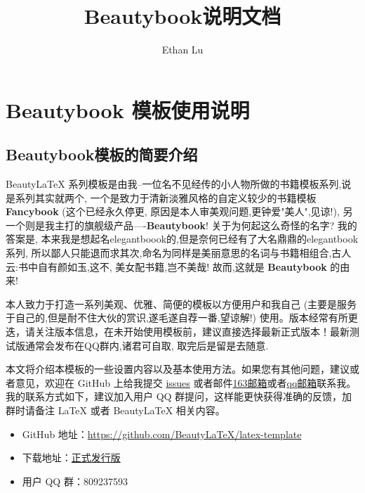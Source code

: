 \documentclass{Beautybook-V6.1}
\begin{document}
\thispagestyle{empty}
\title{Beautybook说明文档}
\subtitle{}
\author{Ethan Lu}
\makecover




\frontmatter
{}

\thispagestyle{empty}
\tableofcontents\let\cleardoublepage\clearpage

\mainmatter
{}
\part{\textbf{Beautybook} 模板使用说明}

\chapter{Beautybook模板的简要介绍}
Beauty\LaTeX{} 系列模板是由我--一位名不见经传的小人物所做的书籍模板系列,说是系列其实就两个, 一个是致力于清新淡雅风格的自定义较少的书籍模板 \textbf{Fancybook} (这个已经永久停更, 原因是本人审美观问题,更钟爱"美人",见谅!), 另一个则是我主打的旗舰级产品----\textbf{Beautybook}! 关于为何起这么奇怪的名字? 我的答案是, 本来我是想起名elegantboook的,但是奈何已经有了大名鼎鼎的elegantbook系列, 所以鄙人只能退而求其次,命名为同样是美丽意思的名词与书籍相组合,古人云:书中自有颜如玉,这不, 美女配书籍,岂不美哉! 故而,这就是 \textbf{Beautybook} 的由来!

本人致力于打造一系列美观、优雅、简便的模板以方便用户和我自己 (主要是服务于自己的,但是耐不住大伙的赏识,遂毛遂自荐一番,望谅解!) 使用。版本经常有所更迭，请关注版本信息，在未开始使用模板前，建议直接选择最新正式版本！最新测试版通常会发布在QQ群内,诸君可自取, 取完后是留是去随意.


本文将介绍本模板的一些设置内容以及基本使用方法。如果您有其他问题，建议或者意见，欢迎在 GitHub 上给我提交 \href{https://github.com/BeautyLaTeX/latex-template/issues}{issues} 或者邮件\href{h1479840692@163.com}{163邮箱}或者\href{1479840692@qq.com}{qq邮箱}联系我。我的联系方式如下，建议加入用户 QQ 群提问，这样能更快获得准确的反馈，加群时请备注 \LaTeX{} 或者 Beauty\LaTeX{} 相关内容。
\begin{itemize}
  \item GitHub 地址：\href{https://github.com/BeautyLaTeX/latex-template}{https://github.com/BeautyLaTeX/latex-template}
  \item 下载地址：\href{https://github.com/BeautyLaTeX/latex-template/releases}{正式发行版}
  \item 用户 QQ 群：809237593
\end{itemize}
\end{document}
